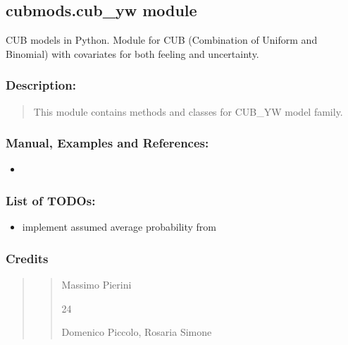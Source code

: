 \documentclass[letterpaper,10pt,english]{sphinxmanual}
\begin{document}
\subsection{cubmods.cub\_yw module}
\label{\detokenize{cubmods:module-cubmods.cub_yw}}\label{\detokenize{cubmods:cubmods-cub-yw-module}}\label{\detokenize{cubmods:cubyw-module}}
\sphinxAtStartPar
CUB models in Python.
Module for CUB (Combination of Uniform
and Binomial) with covariates
for both feeling and uncertainty.


\subsubsection{Description:}
\label{\detokenize{cubmods:id11}}\begin{quote}

\sphinxAtStartPar
This module contains methods and classes
for CUB\_YW model family.
\end{quote}


\subsubsection{Manual, Examples and References:}
\label{\detokenize{cubmods:id12}}\begin{itemize}
\item {} 
\sphinxAtStartPar
{}

\end{itemize}


\subsubsection{List of TODOs:}
\label{\detokenize{cubmods:id13}}\begin{itemize}
\item {} 
\sphinxAtStartPar
implement assumed average probability from 

\end{itemize}


\subsubsection{Credits}
\label{\detokenize{cubmods:id14}}\begin{quote}
\begin{quote}\begin{description}
\sphinxAtStartPar
Massimo Pierini

\sphinxhyphen{}24

\sphinxAtStartPar
Domenico Piccolo, Rosaria Simone

\sphinxAtStartPar
{}

\end{description}\end{quote}
\end{quote}
\end{document}
